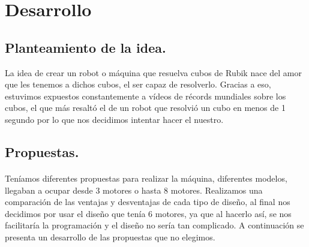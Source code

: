 \documentclass[12pt, letterpaper]{article}
\begin{document}
\section{Desarrollo}
\subsection{Planteamiento de la idea.}
La idea de crear un robot o máquina que resuelva cubos de Rubik nace del amor que les tenemos a dichos cubos, el ser capaz de resolverlo. Gracias a eso, estuvimos expuestos constantemente a vídeos de récords mundiales sobre los cubos, el que más resaltó el de un robot que resolvió un cubo en menos de 1 segundo por lo que nos decidimos intentar hacer el nuestro.
\subsection{Propuestas.}
\paragraph{}
Teníamos diferentes propuestas para realizar la máquina, diferentes modelos, llegaban a ocupar desde 3 motores o hasta 8 motores. Realizamos una comparación de las ventajas y desventajas de cada tipo de diseño, al final nos decidimos por usar el diseño que tenía 6 motores, ya que al hacerlo así, se nos facilitaría la programación y el diseño no sería tan complicado.
A continuación se presenta un desarrollo de las propuestas que no elegimos.
\end{document}
